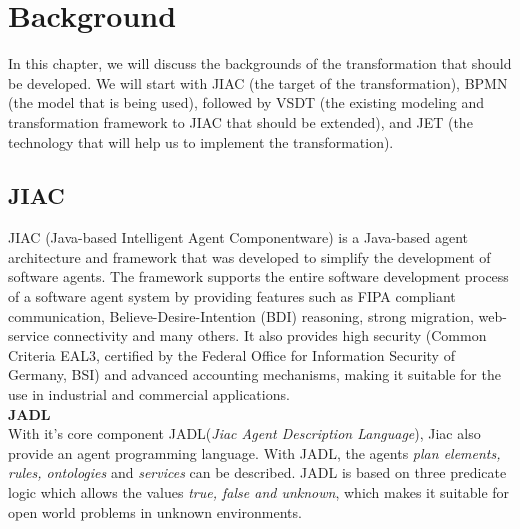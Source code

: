 \chapter{Background}
\label{chap:background}
In this chapter, we will discuss the backgrounds of the transformation that should be developed. We will start with JIAC (the target of the transformation), BPMN (the model that is being used), followed by VSDT (the existing modeling and transformation framework to JIAC that should be extended), and JET (the technology that will help us to implement the transformation).

\section{JIAC}
JIAC (Java-based Intelligent Agent Componentware) is a Java-based agent architecture and framework that was developed to simplify the development of software agents\cite{JIACWEB}. The framework supports the entire software development process of a software agent system by providing features such as FIPA compliant communication, Believe-Desire-Intention (BDI) reasoning, strong migration, web-service
connectivity and many others. It also provides high security (Common Criteria EAL3,
certified by the Federal Office for Information Security of Germany, BSI) and advanced
accounting mechanisms, making it suitable for the use in industrial and
commercial applications.\\

\textbf{JADL}\\
With it's core component JADL(\textit{Jiac Agent Description Language})\cite{jadl_basic}, Jiac also provide an agent programming language. With JADL, the agents \textit{plan elements, rules, ontologies} and \textit{services} can be described. JADL is based on three predicate logic which allows the values \textit{true, false and unknown}, which makes it suitable for open world problems in unknown environments.
\\

